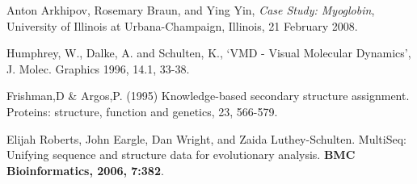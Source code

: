 \documentclass{article}
\begin{document}
\begin{thebibliography}{9}
	Anton Arkhipov, Rosemary Braun, and Ying Yin,
	\textit{Case Study: Myoglobin},
	University of Illinois at Urbana-Champaign, Illinois,
	21 February 2008.
	
	Humphrey, W., Dalke, A. and Schulten, K., `VMD - Visual
	Molecular Dynamics', J. Molec. Graphics 1996, 14.1, 33-38.

	Frishman,D \& Argos,P. (1995) Knowledge-based secondary structure
	assignment. Proteins: structure, function and genetics, 23, 566-579.

        Elijah Roberts, John Eargle, Dan Wright, and Zaida Luthey-Schulten.
        MultiSeq: Unifying sequence and structure data for evolutionary analysis.
        \textbf{BMC Bioinformatics, 2006, 7:382}.

\end{thebibliography}

\vspace{\fill}

\end{document}
